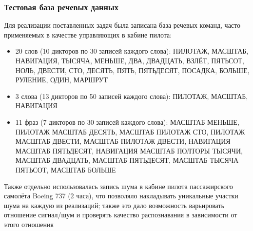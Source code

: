 
\begin{frame}
\frametitle{Тестовая база речевых данных}
\footnotesize
\vfill
Для реализации поставленных задач была записана база речевых команд, часто применяемых в качестве управляющих в кабине пилота:
\scriptsize
\vfill
\begin{itemize}
	\item 20 слов (10 дикторов по 30 записей каждого слова): {\tiny ПИЛОТАЖ, МАСШТАБ, НАВИГАЦИЯ, ТЫСЯЧА, МЕНЬШЕ, ДВА, ДВАДЦАТЬ, ВЗЛЁТ, ПЯТЬСОТ, НОЛЬ, ДВЕСТИ, СТО, ДЕСЯТЬ, ПЯТЬ, ПЯТЬДЕСЯТ, ПОСАДКА, БОЛЬШЕ, РУЛЕНИЕ, ОДИН, МАРШРУТ}
	\item 3 слова (13 дикторов по 50 записей каждого слова): {\tiny ПИЛОТАЖ, МАСШТАБ, НАВИГАЦИЯ}
	\item 11 фраз (7 дикторов по 30 записей каждого слова): {\tiny МАСШТАБ МЕНЬШЕ, ПИЛОТАЖ МАСШТАБ ДЕСЯТЬ, МАСШТАБ ПИЛОТАЖ СТО, ПИЛОТАЖ МАСШТАБ ДВЕСТИ, МАСШТАБ ПИЛОТАЖ ДВЕСТИ, НАВИГАЦИЯ МАСШТАБ ПЯТЬДЕСЯТ, НАВИГАЦИЯ МАСШТАБ ПОЛТОРЫ ТЫСЯЧИ, МАСШТАБ ДВАДЦАТЬ, МАСШТАБ ПЯТЬДЕСЯТ, МАСШТАБ ТЫСЯЧА ПЯТЬСОТ, МАСШТАБ БОЛЬШЕ}
\end{itemize}
\footnotesize
\vfill
Также отдельно использовалась запись шума в кабине пилота пассажирского самолёта Boeing 737 (2 часа), что позволяло накладывать уникальные участки шума на каждую из реализаций; также это дало возможность варьировать отношение сигнал/шум и проверять качество распознавания в зависимости от этого отношения
\vfill
\end{frame}

